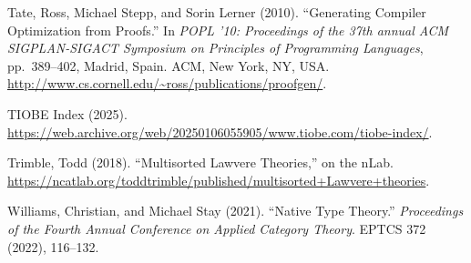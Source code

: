 \documentclass{article}
\begin{document}
\begin{thebibliography}{99}
Tate, Ross, Michael Stepp, and Sorin Lerner (2010). 
``Generating Compiler Optimization from Proofs.'' 
In \emph{POPL '10: Proceedings of the 37th annual ACM SIGPLAN-SIGACT Symposium on Principles of Programming Languages}, 
pp.\ 389--402, Madrid, Spain. 
ACM, New York, NY, USA. 
\url{http://www.cs.cornell.edu/~ross/publications/proofgen/}.

TIOBE Index (2025). 
\url{https://web.archive.org/web/20250106055905/www.tiobe.com/tiobe-index/}.

Trimble, Todd (2018). 
``Multisorted Lawvere Theories,'' on the nLab. 
\url{https://ncatlab.org/toddtrimble/published/multisorted+Lawvere+theories}.

Williams, Christian, and Michael Stay (2021). ``Native Type Theory.'' \emph{Proceedings of the Fourth Annual Conference on Applied Category Theory}. EPTCS 372 (2022), 116--132.

\end{thebibliography}
\end{document}
